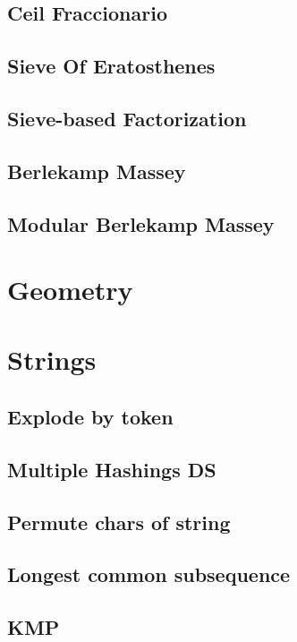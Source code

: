 \subsection{Ceil Fraccionario}
\subsection{Sieve Of Eratosthenes}
\subsection{Sieve-based Factorization}
\subsection{Berlekamp Massey}
\subsection{Modular Berlekamp Massey}

\section{Geometry}


\section{Strings}
\subsection{Explode by token}
\subsection{Multiple Hashings DS}
\subsection{Permute chars of string}
\subsection{Longest common subsequence}
\subsection{KMP}


